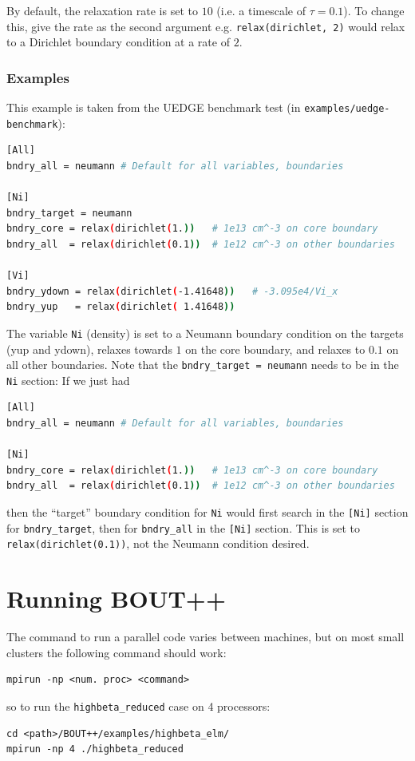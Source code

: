 \documentclass[12pt]{article}
\newcommand{\code}[1]{\texttt{#1}}
\begin{document}
By default, the relaxation rate is set to $10$ (i.e. a timescale of $\tau=0.1$).
To change this, give the rate as the second argument e.g. \code{relax(dirichlet, 2)} would relax to a Dirichlet boundary condition at a rate of $2$.

\subsubsection{Examples}

This example is taken from the UEDGE benchmark test (in \texttt{examples/uedge-benchmark}):
\begin{lstlisting}[language=bash,numbers=none]
[All]
bndry_all = neumann # Default for all variables, boundaries
  
[Ni]
bndry_target = neumann
bndry_core = relax(dirichlet(1.))   # 1e13 cm^-3 on core boundary
bndry_all  = relax(dirichlet(0.1))  # 1e12 cm^-3 on other boundaries

[Vi]
bndry_ydown = relax(dirichlet(-1.41648))   # -3.095e4/Vi_x
bndry_yup   = relax(dirichlet( 1.41648))
\end{lstlisting}

The variable \code{Ni} (density) is set to a Neumann boundary condition
on the targets (yup and ydown), relaxes towards $1$ on the core boundary,
and relaxes to $0.1$ on all other boundaries. Note that the \code{bndry\_target = neumann} needs to be in the \code{Ni} section: If we just had
\begin{lstlisting}[language=bash,numbers=none]
[All]
bndry_all = neumann # Default for all variables, boundaries

[Ni]
bndry_core = relax(dirichlet(1.))   # 1e13 cm^-3 on core boundary
bndry_all  = relax(dirichlet(0.1))  # 1e12 cm^-3 on other boundaries
\end{lstlisting}
then the ``target'' boundary condition for \code{Ni} would first search
in the \code{[Ni]} section for \code{bndry\_target}, then for \code{bndry\_all}
in the \code{[Ni]} section. This is set to \code{relax(dirichlet(0.1))}, not
the Neumann condition desired.

\section{Running BOUT++}
\label{sec:running}

The command to run a parallel code varies between machines, but on most small clusters
the following command should work:
\begin{verbatim}
mpirun -np <num. proc> <command>
\end{verbatim}
so to run the \code{highbeta\_reduced} case on 4 processors:
\begin{verbatim}
cd <path>/BOUT++/examples/highbeta_elm/
mpirun -np 4 ./highbeta_reduced
\end{verbatim}
\end{document}
